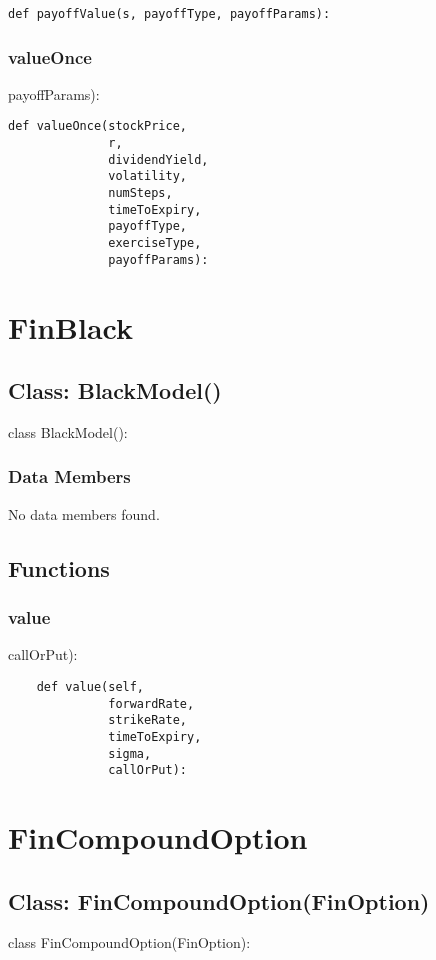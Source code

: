 \documentclass[twoside,11pt]{book}
\begin{document}
\begin{lstlisting}
def payoffValue(s, payoffType, payoffParams):
\end{lstlisting}

\subsubsection*{{\bf valueOnce}}
payoffParams): 

\begin{lstlisting}
def valueOnce(stockPrice,
              r,
              dividendYield,
              volatility,
              numSteps,
              timeToExpiry,
              payoffType,
              exerciseType,
              payoffParams):
\end{lstlisting}

\newpage
\section{FinBlack}

\subsection*{Class: BlackModel()}
class BlackModel(): 

\subsubsection*{Data Members}
No data members found.

\subsection*{Functions}

\subsubsection*{{\bf value}}
callOrPut): 

\begin{lstlisting}
    def value(self,
              forwardRate,
              strikeRate,
              timeToExpiry,
              sigma,
              callOrPut):
\end{lstlisting}

\newpage
\section{FinCompoundOption}

\subsection*{Class: FinCompoundOption(FinOption)}
class FinCompoundOption(FinOption): 
\end{document}
